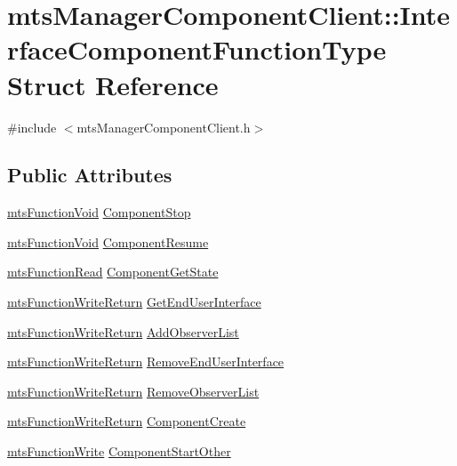 \hypertarget{structmts_manager_component_client_1_1_interface_component_function_type}{\section{mts\-Manager\-Component\-Client\-:\-:Interface\-Component\-Function\-Type Struct Reference}
\label{structmts_manager_component_client_1_1_interface_component_function_type}
}


{\ttfamily \#include $<$mts\-Manager\-Component\-Client.\-h$>$}

\subsection*{Public Attributes}
\begin{DoxyCompactItemize}
\item 
\hyperlink{classmts_function_void}{mts\-Function\-Void} \hyperlink{structmts_manager_component_client_1_1_interface_component_function_type_aed082c4c86dba8014954221109f7c58f}{Component\-Stop}
\item 
\hyperlink{classmts_function_void}{mts\-Function\-Void} \hyperlink{structmts_manager_component_client_1_1_interface_component_function_type_a496db822592a853aa677182211beb6e0}{Component\-Resume}
\item 
\hyperlink{classmts_function_read}{mts\-Function\-Read} \hyperlink{structmts_manager_component_client_1_1_interface_component_function_type_abefd4a2d50f822ea0ecf8326c029e0bd}{Component\-Get\-State}
\item 
\hyperlink{classmts_function_write_return}{mts\-Function\-Write\-Return} \hyperlink{structmts_manager_component_client_1_1_interface_component_function_type_a70bfbf721a72448bd92a65886155356a}{Get\-End\-User\-Interface}
\item 
\hyperlink{classmts_function_write_return}{mts\-Function\-Write\-Return} \hyperlink{structmts_manager_component_client_1_1_interface_component_function_type_af4546cad19d98c11d2022d4ac060d344}{Add\-Observer\-List}
\item 
\hyperlink{classmts_function_write_return}{mts\-Function\-Write\-Return} \hyperlink{structmts_manager_component_client_1_1_interface_component_function_type_ac1bcafb0280bd20b56a89bade8f7172e}{Remove\-End\-User\-Interface}
\item 
\hyperlink{classmts_function_write_return}{mts\-Function\-Write\-Return} \hyperlink{structmts_manager_component_client_1_1_interface_component_function_type_a199fcb11e739ade7ff2b787b899ac5c3}{Remove\-Observer\-List}
\item 
\hyperlink{classmts_function_write_return}{mts\-Function\-Write\-Return} \hyperlink{structmts_manager_component_client_1_1_interface_component_function_type_a0ca3f74d401e16140df73ed6d68d3781}{Component\-Create}
\item 
\hyperlink{classmts_function_write}{mts\-Function\-Write} \hyperlink{structmts_manager_component_client_1_1_interface_component_function_type_a20331f3febb16921a0e90842eb8e31fd}{Component\-Start\-Other}
\end{DoxyCompactItemize}


